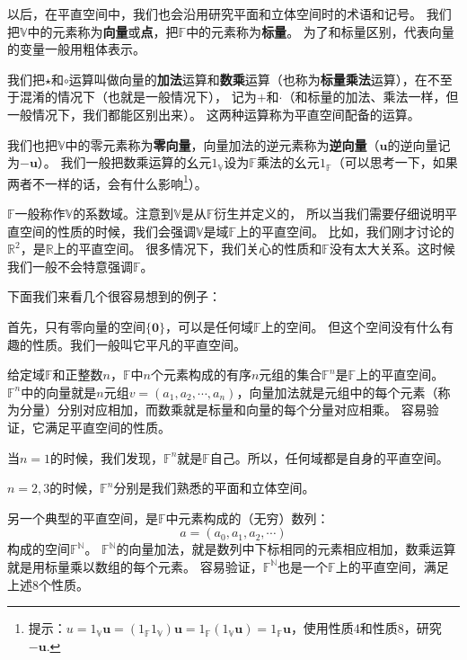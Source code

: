 \documentclass[12pt,UTF8]{ctexbook}
\begin{document}
以后，在平直空间中，我们也会沿用研究平面和立体空间时的术语和记号。
我们把$\mathbb{V}$中的元素称为\textbf{向量}或\textbf{点}，把$\mathbb{F}$中的元素称为\textbf{标量}。
为了和标量区别，代表向量的变量一般用粗体表示。

我们把$\star$和$\circ$运算叫做向量的\textbf{加法}运算和\textbf{数乘}运算（也称为\textbf{标量乘法}运算），在不至于混淆的情况下（也就是一般情况下），
记为$+$和$\cdot$（和标量的加法、乘法一样，但一般情况下，我们都能区别出来）。
这两种运算称为平直空间配备的运算。

我们也把$\mathbb{V}$中的零元素称为\textbf{零向量}，向量加法的逆元素称为\textbf{逆向量}（$\mathbf{u}$的逆向量记为$-\mathbf{u}$）。
我们一般把数乘运算的幺元$1_\mathbb{V}$设为$\mathbb{F}$乘法的幺元$1_\mathbb{F}$（可以思考一下，如果两者不一样的话，会有什么影响\footnote{提示：$u = 1_\mathbb{V}\mathbf{u} = (1_\mathbb{F}1_\mathbb{V})\mathbf{u} = 1_\mathbb{F}(1_\mathbb{V} \mathbf{u}) = 1_\mathbb{F}\mathbf{u}$，使用性质4和性质8，研究$-\mathbf{u}.$}）。

$\mathbb{F}$一般称作$\mathbb{V}$的系数域。注意到$\mathbb{V}$是从$\mathbb{F}$衍生并定义的，
所以当我们需要仔细说明平直空间的性质的时候，我们会强调$\mathbb{V}$是域$\mathbb{F}$上的平直空间。
比如，我们刚才讨论的$\mathbb{R}^2$，是$\mathbb{R}$上的平直空间。
很多情况下，我们关心的性质和$\mathbb{F}$没有太大关系。这时候我们一般不会特意强调$\mathbb{F}$。

下面我们来看几个很容易想到的例子：

首先，只有零向量的空间$\{\mathbf{0}\}$，可以是任何域$\mathbb{F}$上的空间。
但这个空间没有什么有趣的性质。我们一般叫它平凡的平直空间。

给定域$\mathbb{F}$和正整数$n$，$\mathbb{F}$中$n$个元素构成的有序$n$元组的集合$\mathbb{F}^n$是$\mathbb{F}$上的平直空间。
$\mathbb{F}^n$中的向量就是$n$元组$v = (a_1, a_2, \cdots, a_n)$，向量加法就是元组中的每个元素（称为分量）分别对应相加，而数乘就是标量和向量的每个分量对应相乘。
容易验证，它满足平直空间的性质。

当$n=1$的时候，我们发现，$\mathbb{F}^n$就是$\mathbb{F}$自己。所以，任何域都是自身的平直空间。

$n=2,3$的时候，$\mathbb{F}^n$分别是我们熟悉的平面和立体空间。

另一个典型的平直空间，是$\mathbb{F}$中元素构成的（无穷）数列：
$$ a = (a_0, a_1, a_2, \cdots ) $$
构成的空间$\mathbb{F}^\mathbb{N}$。
$\mathbb{F}^\mathbb{N}$的向量加法，就是数列中下标相同的元素相应相加，数乘运算就是用标量乘以数组的每个元素。
容易验证，$\mathbb{F}^\mathbb{N}$也是一个$\mathbb{F}$上的平直空间，满足上述8个性质。
\end{document}
